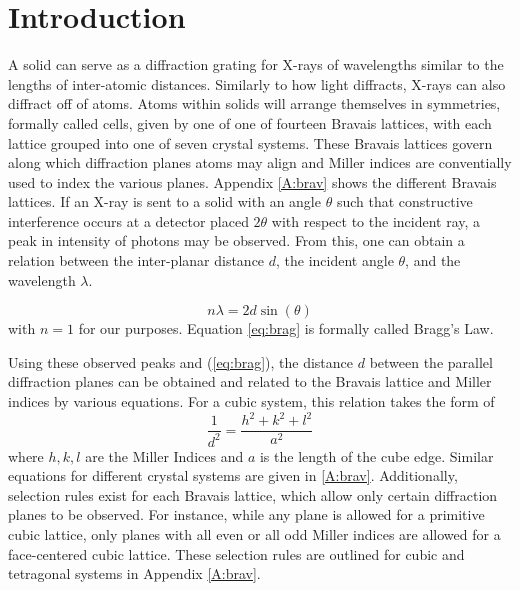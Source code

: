 \documentclass[12pt]{article}
\begin{document}
\newpage

\tableofcontents{}

\thispagestyle{empty}
\pagebreak
\setcounter{page}{1}


\section{Introduction}\label{sec:int}

A solid can serve as a diffraction grating for X-rays of wavelengths similar 
to the lengths of inter-atomic distances. Similarly to how light diffracts, X-rays 
can also diffract off of atoms. Atoms within solids will arrange themselves in 
symmetries, formally called cells, given
by one of one of fourteen Bravais lattices, with each lattice grouped into one 
of seven crystal systems. These Bravais lattices govern along which diffraction
planes atoms may align and Miller indices are conventially used to index the various 
planes. Appendix \ref{A:brav} shows the different Bravais lattices.
If an X-ray is sent to a solid with an angle $\theta$ such that
constructive interference occurs at a detector placed $2\theta$ with respect to the 
incident ray, a peak in intensity of photons may be observed. From this, one can
obtain a relation between the inter-planar
distance $d$, the incident angle $\theta$, and the wavelength $\lambda$.

\begin{equation}\label{eq:brag}
	n\lambda=2d\sin(\theta)
\end{equation}
with $n=1$ for our purposes. Equation \ref{eq:brag} is formally called Bragg's Law. 

Using these observed peaks and (\ref{eq:brag}), the distance $d$ between the parallel 
diffraction planes can be obtained and related to the 
Bravais lattice and Miller indices by various equations. For a cubic system, 
this relation
takes the form of
%
\begin{equation}\label{eq:cubic}
	\frac{1}{d^2}=\frac{h^2+k^2+l^2}{a^2}
\end{equation}
%
where $h,k,l$ are the Miller Indices and $a$ is the length of the cube edge. Similar equations
for different crystal systems are given in \ref{A:brav}. Additionally, selection rules exist for each Bravais
lattice, which allow only certain diffraction planes to be observed. For instance, while any plane is allowed for a
 primitive cubic lattice, only planes with all even or all odd Miller indices are allowed for a face-centered cubic lattice.
 These selection rules are outlined for cubic and tetragonal systems in Appendix \ref{A:brav}.
\end{document}
